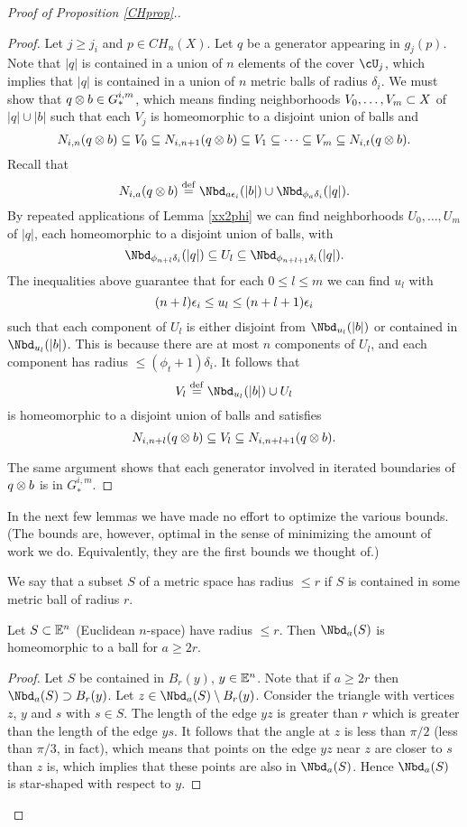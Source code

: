 \begin{proof}[Proof of Proposition \ref{CHprop}.]
\begin{proof}
Let $j \ge j_i$ and $p\in CH_n(X)$.
Let $q$ be a generator appearing in $g_j(p)$.
Note that $|q|$ is contained in a union of $n$ elements of the cover $\cU_j$,
which implies that $|q|$ is contained in a union of $n$ metric balls of radius $\delta_i$.
We must show that $q\otimes b \in G_*^{i,m}$, which means finding neighborhoods
$V_0,\ldots,V_m \subset X$ of $|q|\cup |b|$ such that each $V_j$
is homeomorphic to a disjoint union of balls and
\[
	N_{i,n}(q\otimes b) \subseteq V_0 \subseteq N_{i,n+1}(q\otimes b)
			\subseteq V_1 \subseteq \cdots \subseteq V_m \subseteq N_{i,t}(q\otimes b) .
\]
Recall that
\[
	N_{i,a}(q\ot b) \deq \Nbd_{a\ep_i}(|b|) \cup \Nbd_{\phi_a\delta_i}(|q|).
\]
By repeated applications of Lemma \ref{xx2phi} we can find neighborhoods $U_0,\ldots,U_m$
of $|q|$, each homeomorphic to a disjoint union of balls, with
\[
	\Nbd_{\phi_{n+l} \delta_i}(|q|) \subeq U_l \subeq \Nbd_{\phi_{n+l+1} \delta_i}(|q|) .
\]
The inequalities above guarantee that 
for each $0\le l\le m$ we can find $u_l$ with 
\[
	(n+l)\epsilon_i \le u_l \le (n+l+1)\epsilon_i
\]
such that each component of $U_l$ is either disjoint from $\Nbd_{u_l}(|b|)$ or contained in 
$\Nbd_{u_l}(|b|)$.
This is because there are at most $n$ components of $U_l$, and each component
has radius $\le (\phi_t + 1) \delta_i$.
It follows that
\[
	V_l \deq \Nbd_{u_l}(|b|) \cup U_l
\]
is homeomorphic to a disjoint union of balls and satisfies
\[
	N_{i,n+l}(q\otimes b) \subseteq V_l \subseteq N_{i,n+l+1}(q\otimes b) .
\]

The same argument shows that each generator involved in iterated boundaries of $q\otimes b$
is in $G_*^{i,m}$.
\end{proof}

In the next few lemmas we have made no effort to optimize the various bounds.
(The bounds are, however, optimal in the sense of minimizing the amount of work
we do.  Equivalently, they are the first bounds we thought of.)

We say that a subset $S$ of a metric space has radius $\le r$ if $S$ is contained in
some metric ball of radius $r$.

\begin{lemma}
Let $S \subset \mathbb{E}^n$ (Euclidean $n$-space) have radius $\le r$.  
Then $\Nbd_a(S)$ is homeomorphic to a ball for $a \ge 2r$.
\end{lemma}

\begin{proof} \label{xxyy2}
Let $S$ be contained in $B_r(y)$, $y \in \mathbb{E}^n$.
Note that if $a \ge 2r$ then $\Nbd_a(S) \sup B_r(y)$.
Let $z\in \Nbd_a(S) \setmin B_r(y)$.
Consider the triangle
 with vertices $z$, $y$ and $s$ with $s\in S$.
The length of the edge $yz$ is greater than $r$ which is greater
than the length of the edge $ys$.
It follows that the angle at $z$ is less than $\pi/2$ (less than $\pi/3$, in fact),
which means that points on the edge $yz$ near $z$ are closer to $s$ than $z$ is,
which implies that these points are also in $\Nbd_a(S)$.
Hence $\Nbd_a(S)$ is star-shaped with respect to $y$.
\end{proof}


\end{proof}
